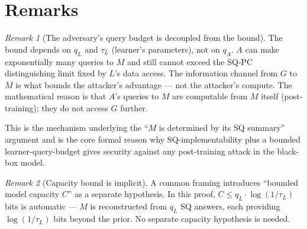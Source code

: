 \documentclass[11pt,a4paper]{article}
\theoremstyle{definition}
\theoremstyle{remark}
\newtheorem*{remark}{Remark}
\begin{document}
\section{Remarks}

\begin{remark}[The adversary's query budget is decoupled from the bound]
The bound depends on $q_L$ and $\tau_L$ (learner's parameters), not on $q_A$. $A$ can make exponentially many queries to $M$ and still cannot exceed the SQ-PC distinguishing limit fixed by $L$'s data access. The information channel from $G$ to $M$ is what bounds the attacker's advantage --- not the attacker's compute. The mathematical reason is that $A$'s queries to $M$ are computable from $M$ itself (post-training); they do not access $G$ further.

This is the mechanism underlying the ``$M$ is determined by its SQ summary'' argument and is the core formal reason why SQ-implementability plus a bounded learner-query-budget gives security against any post-training attack in the black-box model.
\end{remark}

\begin{remark}[Capacity bound is implicit]
A common framing introduces ``bounded model capacity $C$'' as a separate hypothesis. In this proof, $C \le q_L \cdot \log(1/\tau_L)$ bits is automatic --- $M$ is reconstructed from $q_L$ SQ answers, each providing $\log(1/\tau_L)$ bits beyond the prior. No separate capacity hypothesis is needed.
\end{remark}
\end{document}
